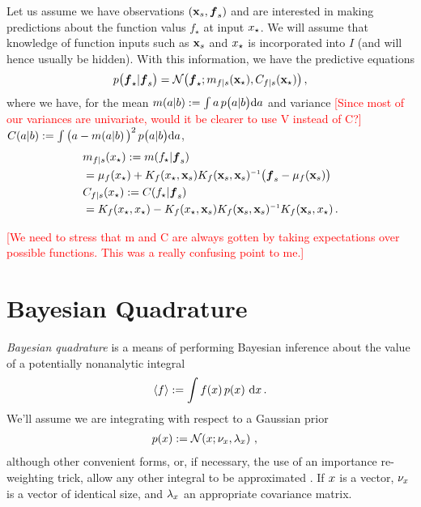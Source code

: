 \documentclass{article}
\renewcommand{\pskinny}[2]{p\big(#1|#2\big)}
\begin{document}
Let us assume we have observations $(\vlfv_s,\vf_s)$ and
are interested in making predictions about the function
valus $f_\star$ at input $\lfv_\star$. We will assume that knowledge of function inputs such as
$\vlfv_s$ and $\lfv_\star$ is incorporated into $I$ (and will hence usually be hidden). With
this information, we have the predictive equations
$$
\pskinny{\vf_\star}{\vf_s} = 
\bN{\vf_\star}
{\meancond{f}{\vlfv_\star}{s}}
{\covcond{f}{\vlfv_\star}{s}}\,,
$$
where we have, for the mean $\novmean{a}{b}\deq \int a\,\pskinny{a}{b} \ud
a$ and variance \textcolor{red}{[Since most of our variances are univariate, would it be clearer to use V instead of C?]}$\novcov{a}{b}\deq \int
\big(a-\novmean{a}{b}\big)^2\,\pskinny{a}{b} \ud a$,
\begin{align} 
\textstyle
&\meancond{f}{\lfv_\star}{s}
\deq \mean{f_\star}{\vf_s}
\nonumber\\
&= \mu_{f}(\lfv_\star) + 
K_{f}(\lfv_\star,\vlfv_s)
K_{f}(\vlfv_s,\vlfv_s)\inv
\bigl(\vf_s-{\mu}_{f}(\vlfv_s)\bigr) \label{eq:GPMean}
\\
&\covcond{f}{\lfv_\star}{s}
\deq {\cov{f_\star}{\vf_s}} 
\nonumber\\
&= K_{f}(\lfv_\star,\lfv_\star) - 
K_{f}(\lfv_\star,\vlfv_s)
K_{f}(\vlfv_s,\vlfv_s)\inv
K_{f}(\vlfv_s,\lfv_\star)\,. \nonumber%
\end{align} 

\textcolor{red}{[We need to stress that m and C are always gotten by taking expectations over possible functions.  This was a really confusing point to me.]}

\section{Bayesian Quadrature} \label{sec:BQ}


\emph{Bayesian quadrature} \citep{BZHermiteQuadrature,BZMonteCarlo} is a means of
performing Bayesian inference about the value of a potentially
nonanalytic integral 
\begin{equation} \label{eq:intyf}
 \inty{f} \deq \int f(\lfv)\,\po{\lfv}\,\ud\lfv\,.
\end{equation}
We'll assume we are integrating with respect to a Gaussian
prior
\begin{align}\label{eq:phiprior}
\textstyle
 \po{\lfv} & \deq \N{\lfv}{\nu_{\lfv}}{\lambda_{\lfv}} \,,
\end{align}
although other convenient forms, or, if necessary, the use of an
importance re-weighting trick, allow any other integral to be
approximated \citep{OsborneAnon}. If $\lfv$ is a vector, $\nu_{\lfv}$ is a  vector of identical size, and $\lambda_{\lfv}$ an appropriate covariance matrix.
\end{document}
